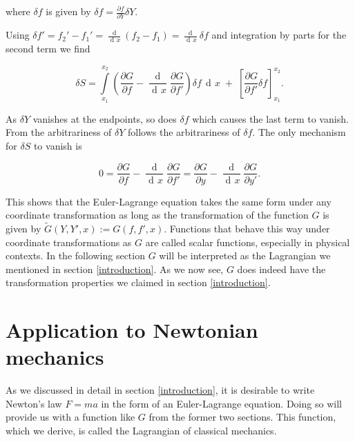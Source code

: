 \documentclass[prb,preprint]{revtex4-1}
\DeclareMathOperator{\dd}{d\!}
\DeclareMathOperator{\ddd}{\mathrm{d}}
\begin{document}
where $\delta f$ is given by $\delta f = \frac{\partial f}{\partial Y} \delta Y$. 


Using $\delta f' = f_2' - f_1' = \frac{\ddd}{\dd x}(f_2 - f_1) = \frac{\dd}{\dd x} \delta f$ and integration by parts for the second term we find


\begin{equation}
\delta S = \int\limits_{x_1}^{x_2} \left( \frac{\partial G}{\partial f}
- \frac{\ddd}{\dd x} \frac{\partial G}{\partial f'} \right) \delta f \, \dd x \;
+ \; \left[\frac{\partial G}{\partial f'} \delta f \right]_{x_1}^{x_2}.
\end{equation}


As $\delta Y$ vanishes at the endpoints, so does $\delta f$ which causes the last term to vanish. From the arbitrariness of $\delta Y$ follows the arbitrariness of $\delta f$. The only mechanism for $\delta S$ to vanish is

\begin{equation}
0 = \frac{\partial G}{\partial f} - \frac{\ddd}{\dd x} \frac{\partial G}{\partial f'}
= \frac{\partial G}{\partial y} - \frac{\ddd}{\dd x} \frac{\partial G}{\partial y'}.
\end{equation}

This shows that the Euler-Lagrange equation takes the same form under any coordinate transformation as long as the transformation of the function $G$ is given by $\widetilde{G}(Y,Y',x) := G(f,f',x)$. Functions that behave this way under coordinate transformations as $G$ are called scalar functions, especially in physical contexts. 
In the following section $G$ will be interpreted as the Lagrangian we mentioned in section \ref{introduction}. As we now see, $G$ does indeed have the transformation properties we claimed in section \ref{introduction}.

\section{Application to Newtonian mechanics}%

As we discussed in detail in section \ref{introduction}, it is desirable to write Newton's law $F=ma$ in the form of an Euler-Lagrange equation. Doing so will provide us with a function like $G$ from the former two sections. This function, which we derive, is called the Lagrangian of classical mechanics.
\end{document}

